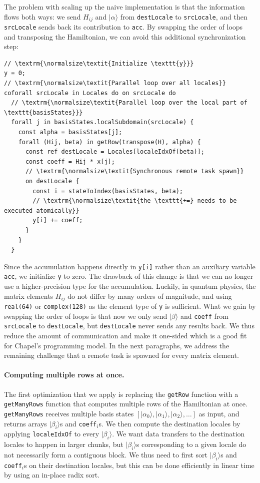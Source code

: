 The problem with scaling up the naive implementation is that the information flows both ways: we send $H_{ij}$ and $|\alpha\rangle$ from \verb|destLocale| to \verb|srcLocale|, and then \verb|srcLocale| sends back its contribution to \verb|acc|. By swapping the order of loops and transposing the Hamiltonian, we can avoid this additional synchronization step:

\begin{verbatim}
// \textrm{\normalsize\textit{Initialize \texttt{y}}}
y = 0;
// \textrm{\normalsize\textit{Parallel loop over all locales}}
coforall srcLocale in Locales do on srcLocale do
  // \textrm{\normalsize\textit{Parallel loop over the local part of \texttt{basisStates}}}
  forall j in basisStates.localSubdomain(srcLocale) {
    const alpha = basisStates[j];
    forall (Hij, beta) in getRow(transpose(H), alpha) {
      const ref destLocale = Locales[localeIdxOf(beta)];
      const coeff = Hij * x[j];
      // \textrm{\normalsize\textit{Synchronous remote task spawn}}
      on destLocale {
        const i = stateToIndex(basisStates, beta);
        // \textrm{\normalsize\textit{the \texttt{+=} needs to be executed atomically}}
        y[i] += coeff;
      }
    }
  }
\end{verbatim}

Since the accumulation happens directly in \verb|y[i]| rather than an auxiliary variable \verb|acc|, we initialize \verb|y| to zero. The drawback of this change is that we can no longer use a higher-precision type for the accumulation. Luckily, in quantum physics, the matrix elements $H_{ij}$ do not differ by many orders of magnitude, and using \verb|real(64)| or \verb|complex(128)| as the element type of \verb|y| is sufficient. What we gain by swapping the order of loops is that now we only send $|\beta\rangle$ and \verb|coeff| from \verb|srcLocale| to \verb|destLocale|, but \verb|destLocale| never sends any results back. We thus reduce the amount of communication and make it one-sided which is a good fit for Chapel's programming model. In the next paragraphs, we address the remaining challenge that a remote task is spawned for every matrix element.

\paragraph{Computing multiple rows at once.} The first optimization that we apply is replacing the \verb|getRow| function with a \verb|getManyRows| function that computes multiple rows of the Hamiltonian at once. \verb|getManyRows| receives multiple basis states $[|\alpha_0\rangle, |\alpha_1\rangle, |\alpha_2\rangle, \dots]$ as input, and returns arrays $|\beta_i\rangle$s and \verb|coeff|$_i$s. We then compute the destination locales by applying \verb|localeIdxOf| to every $|\beta_i\rangle$. We want data transfers to the destination locales to happen in larger chunks, but $|\beta_i\rangle$s corresponding to a given locale do not necessarily form a contiguous block. We thus need to first sort $|\beta_i\rangle$s and \verb|coeff|$_i$s on their destination locales, but this can be done efficiently in linear time by using an in-place radix sort.

